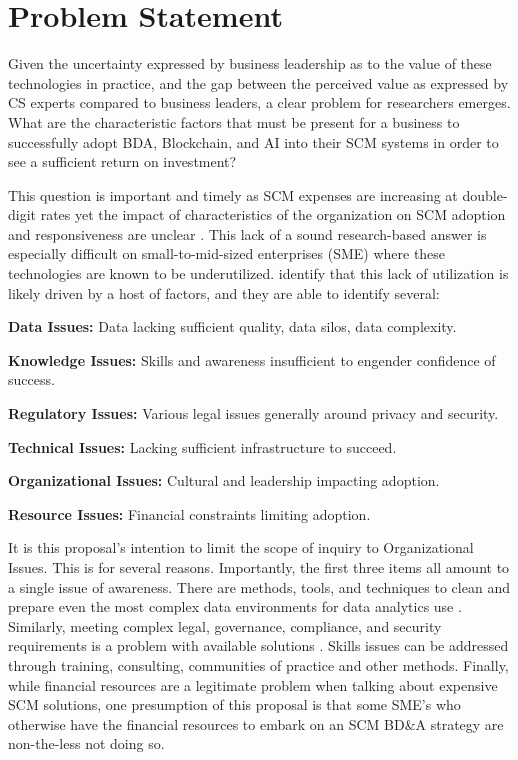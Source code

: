 \section{Problem Statement}

Given the uncertainty expressed by business leadership as to the value of these technologies in practice, and the gap between the perceived value as expressed by CS experts compared to business leaders, a clear problem for researchers emerges. What are the characteristic factors that must be present for a business to successfully adopt BDA, Blockchain, and AI into their SCM systems in order to see a sufficient return on investment?

This question is important and timely as SCM expenses are increasing at double-digit rates yet the impact of characteristics of the organization on SCM adoption and responsiveness are unclear \parencite{storyInfluenceSupplyChain2021}. This lack of a sound research-based answer is especially difficult on small-to-mid-sized enterprises (SME) where these technologies are known to be underutilized.  \textcite{willettsBarriersSMEsAdoption2020} identify that this lack of utilization is likely driven by a host of factors, and they are able to identify several:
\begin{APAitemize}
  \item \textbf{Data Issues:} Data lacking sufficient quality, data silos, data complexity.
  \item \textbf{Knowledge Issues:} Skills and awareness insufficient to engender confidence of success.
  \item \textbf{Regulatory Issues:} Various legal issues generally around privacy and security.
  \item \textbf{Technical Issues:} Lacking sufficient infrastructure to succeed.
  \item \textbf{Organizational Issues:} Cultural and leadership impacting adoption.
  \item \textbf{Resource Issues:} Financial constraints limiting adoption.
\end{APAitemize}

It is this proposal's intention to limit the scope of inquiry to Organizational Issues. This is for several reasons. Importantly, the first three items all amount to a single issue of awareness. There are methods, tools, and techniques to clean and prepare even the most complex data environments for data analytics use \parencite{annelaurentDataLakes2020,souibguiDataQualityETL2019}. Similarly, meeting complex legal, governance, compliance, and security requirements is a problem with available solutions \parencite{hagerSecuringPrivateMedical2020,kennedya.torkuraIntegratingContinuousSecurity2017}. Skills issues can be addressed through training, consulting, communities of practice and other methods. Finally, while financial resources are a legitimate problem when talking about expensive SCM solutions, one presumption of this proposal is that some SME's who otherwise have the financial resources to embark on an SCM BD\&A strategy are non-the-less not doing so.

